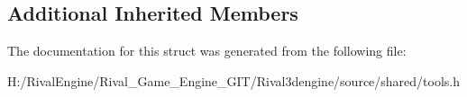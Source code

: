 \subsection*{Additional Inherited Members}


The documentation for this struct was generated from the following file\+:\begin{DoxyCompactItemize}
\item 
H\+:/\+Rival\+Engine/\+Rival\+\_\+\+Game\+\_\+\+Engine\+\_\+\+G\+I\+T/\+Rival3dengine/source/shared/tools.\+h\end{DoxyCompactItemize}
